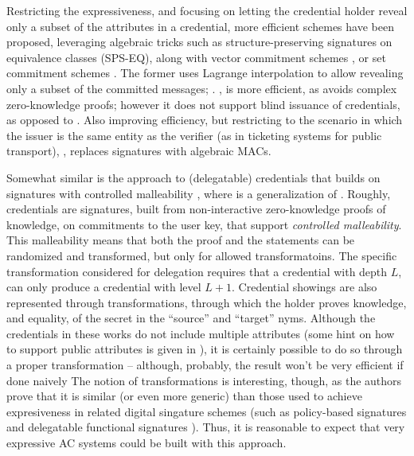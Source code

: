 Restricting the expressiveness, and focusing on letting the credential holder
reveal only a subset of the attributes in a credential, more efficient schemes
have been proposed, leveraging algebraic tricks such as structure-preserving
signatures on equivalence classes (SPS-EQ), along with vector commitment schemes
\cite{cdhk15}, or set commitment schemes \cite{fhs19}. The former uses Lagrange
interpolation to allow revealing only a subset of the committed messages;
. \cite{fhs19}, is more
efficient, as avoids complex zero-knowledge proofs; however it does not support
blind issuance of credentials, as opposed to \cite{cdhk15} .
%
Also improving efficiency, but restricting to the scenario in which the issuer
is the same entity as the verifier (as in ticketing systems for public transport),
\cite{cmz14}, replaces signatures with algebraic MACs.

Somewhat similar is the approach to (delegatable) credentials that builds on
signatures with controlled malleability \cite{bcc+09,cklm14}, where \cite{cklm14}
is a generalization of \cite{bcc+09}. Roughly, credentials are signatures, built
from non-interactive zero-knowledge proofs of knowledge, on commitments to the
user key, that support \emph{controlled malleability}. This malleability means
that both the proof and the statements can be randomized and transformed, but
only for allowed transformatoins. The specific transformation considered for
delegation requires that a credential with depth $L$, can only produce a credential
with level $L+1$. Credential showings are also represented through transformations,
through which the holder proves knowledge, and equality, of the secret in the
``source'' and ``target'' nyms. Although the credentials in these works do not
include multiple attributes (some hint on how to support public attributes is
given in \cite{bcc+09}), it is certainly possible to do so through a proper
transformation -- although, probably, the result won't be very efficient if
done naively  The notion of transformations is interesting,
though, as the authors prove that it is similar (or even more generic) than those
used to achieve expresiveness in related digital singature schemes (such as
policy-based signatures \needcite and delegatable functional signatures \needcite).
Thus, it is reasonable to expect that very expressive AC systems could be built
with this approach.

